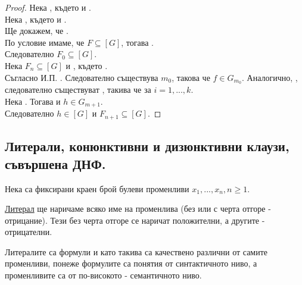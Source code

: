 \begin{proof}
    Нека , където  и 
    . \\
    Нека , където  и 
    . \\
    Ще докажем, че . \\
    По условие имаме, че \(F \subseteq [G]\), тогава . \\
    Следователно \(F_0 \subseteq [G]\). \\
    Нека \(F_n \subseteq [G]\) и , 
    където . \\
    Съгласно И.П. . Следователно съществува \(m_0\), такова 
    че \(f \in G_{m_0}\). Аналогично, , следователно съществуват 
    , такива че  за \(i = 1, ..., k\). \\
    Нека . Тогава  и \(h \in G_{m + 1}\). \\
    Следователно \(h \in [G]\) и \(F_{n + 1} \subseteq [G]\).
\end{proof}

\subsection*{Литерали, конюнктивни и дизюнктивни клаузи, съвършена ДНФ.}
Нека са фиксирани краен брой булеви променливи \(x_1, ..., x_n, n \ge 1\).

\begin{definition}
    \underline{Литерал} ще наричаме всяко име на променлива (без или с черта отгоре - отрицание). Тези 
    без черта отгоре се наричат положителни, а другите - отрицателни. 
\end{definition}

Литералите са формули и като такива са качествено различни от самите променливи, понеже формулите са 
понятия от синтактичното ниво, а променливите са от по-високото - семантичното ниво.

